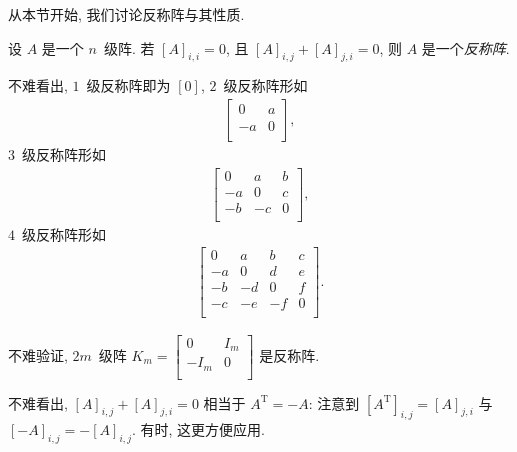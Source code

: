 从本节开始, 我们讨论反称阵与其性质.

\begin{definition}
    设 \(A\) 是一个 \(n\)~级阵.
    若 \([A]_{i,i} = 0\),
    且
    \([A]_{i,j} + [A]_{j,i} = 0\),
    则 \(A\) 是一个\emph{反称阵}.
\end{definition}

\begin{example}
    不难看出, \(1\)~级反称阵即为 \([0]\),
    \(2\)~级反称阵形如
    \begin{align*}
        \begin{bmatrix}
            0  & a \\
            -a & 0 \\
        \end{bmatrix},
    \end{align*}
    \(3\)~级反称阵形如
    \begin{align*}
        \begin{bmatrix}
            0  & a  & b \\
            -a & 0  & c \\
            -b & -c & 0 \\
        \end{bmatrix},
    \end{align*}
    \(4\)~级反称阵形如
    \begin{align*}
        \begin{bmatrix}
            0  & a  & b  & c \\
            -a & 0  & d  & e \\
            -b & -d & 0  & f \\
            -c & -e & -f & 0 \\
        \end{bmatrix}.
    \end{align*}
\end{example}

\begin{example}
    不难验证, \(2m\)~级阵
    \(
    K_m =
    \begin{bmatrix}
        0    & I_m \\
        -I_m & 0   \\
    \end{bmatrix}
    \)
    是反称阵.
\end{example}

不难看出,
\([A]_{i,j} + [A]_{j,i} = 0\)
相当于 \(A^{\mathrm{T}} = -A\):
注意到 \([A^{\mathrm{T}}]_{i,j} = [A]_{j,i}\)
与 \([-A]_{i,j} = -[A]_{i,j}\).
有时, 这更方便应用.

